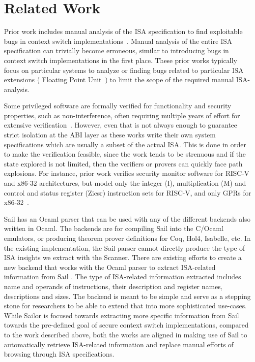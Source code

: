 \section{Related Work}

Prior work includes manual analysis of the ISA specification to find exploitable bugs in context switch implementations~\cite{guard-dilemma, rop-sgx, dtrap-fpu, totw, enclave-isolation}. 
Manual analysis of the entire ISA specification can trivially become erroneous, similar to introducing bugs in context switch implementations in the first place. 
These prior works typically focus on particular systems to analyze or finding bugs related to particular ISA extensions (\eg{} Floating Point Unit~\cite{dtrap-fpu}) to limit the scope of the required manual ISA-analysis. 

Some privileged software are formally verified for functionality and security properties, such as non-interference, often requiring multiple years of effort for extensive verification~\cite{sel4, certikos, komodo}. 
However, even that is not always enough to guarantee strict isolation at the ABI layer as these works write their own system specifications which are usually a subset of the actual ISA. 
This is done in order to make the verification feasible, since the work tends to be strenuous and if the state explored is not limited, then the verifiers or provers can quickly face path explosions. 
For instance, prior work verifies security monitor software for RISC-V and x86-32 architectures, but model only the integer (I), multiplication (M) and control and status register (Zicsr) instruction sets for RISC-V, and only GPRs for x86-32~\cite{serval}. 

Sail has an Ocaml parser that can be used with any of the different backends also written in Ocaml. 
The backends are for compiling Sail into the C/Ocaml emulators, or producing theorem prover definitions for Coq, Hol4, Isabelle, etc. 
In the existing implementation, the Sail parser cannot directly produce the type of ISA insights we extract with the Scanner. 
There are existing efforts to create a new backend that works with the Ocaml parser to extract ISA-related information from Sail \cite{thinkopenly}. 
The type of ISA-related information extracted includes name and operands of instructions, their description and register names, descriptions and sizes. 
The backend is meant to be simple and serve as a stepping stone for researchers to be able to extend that into more sophisticated use-cases. 
While Sailor is focused towards extracting more specific information from Sail towards the pre-defined goal of secure context switch implementations, compared to the work described above, both the works are aligned in making use of Sail to automatically retrieve ISA-related information and replace manual efforts of browsing through ISA specifications. 

